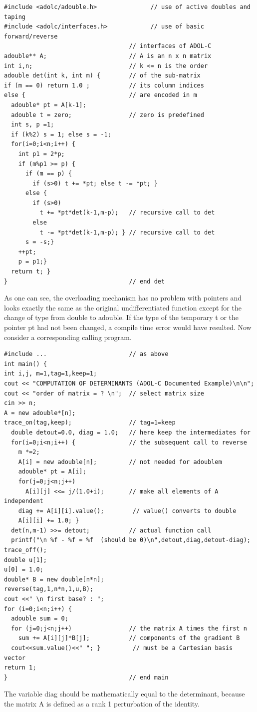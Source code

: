 \documentclass[11pt,twoside]{article}
\begin{document}
\begin{verbatim}
#include <adolc/adouble.h>               // use of active doubles and taping
#include <adolc/interfaces.h>            // use of basic forward/reverse
                                   // interfaces of ADOL-C
adouble** A;                       // A is an n x n matrix
int i,n;                           // k <= n is the order
adouble det(int k, int m) {        // of the sub-matrix
if (m == 0) return 1.0 ;           // its column indices
else {                             // are encoded in m
  adouble* pt = A[k-1];
  adouble t = zero;                // zero is predefined
  int s, p =1;
  if (k%2) s = 1; else s = -1;
  for(i=0;i<n;i++) {
    int p1 = 2*p;
    if (m%p1 >= p) {
      if (m == p) {
        if (s>0) t += *pt; else t -= *pt; }
      else {
        if (s>0)
          t += *pt*det(k-1,m-p);   // recursive call to det
        else
          t -= *pt*det(k-1,m-p); } // recursive call to det
      s = -s;}
    ++pt;
    p = p1;}
  return t; }
}                                  // end det
\end{verbatim}
As one can see, the overloading mechanism has no problem with pointers
and looks exactly the same as the original undifferentiated function
except for the change of type from {\sf double} to {\sf adouble}.
If the type of the temporary {\sf t} or the pointer {\sf pt} had not been changed,
a compile time error would have resulted. Now consider a corresponding
calling program.

\begin{verbatim}
#include ...                       // as above
int main() {
int i,j, m=1,tag=1,keep=1;
cout << "COMPUTATION OF DETERMINANTS (ADOL-C Documented Example)\n\n";
cout << "order of matrix = ? \n";  // select matrix size
cin >> n;
A = new adouble*[n];              
trace_on(tag,keep);                // tag=1=keep
  double detout=0.0, diag = 1.0;   // here keep the intermediates for
  for(i=0;i<n;i++) {               // the subsequent call to reverse
    m *=2;
    A[i] = new adouble[n];         // not needed for adoublem
    adouble* pt = A[i];
    for(j=0;j<n;j++)
      A[i][j] <<= j/(1.0+i);       // make all elements of A independent
    diag += A[i][i].value();        // value() converts to double
    A[i][i] += 1.0; }
  det(n,m-1) >>= detout;           // actual function call 
  printf("\n %f - %f = %f  (should be 0)\n",detout,diag,detout-diag);
trace_off();
double u[1];
u[0] = 1.0;
double* B = new double[n*n];
reverse(tag,1,n*n,1,u,B);
cout <<" \n first base? : ";
for (i=0;i<n;i++) {
  adouble sum = 0;
  for (j=0;j<n;j++)                // the matrix A times the first n
    sum += A[i][j]*B[j];           // components of the gradient B
  cout<<sum.value()<<" "; }         // must be a Cartesian basis vector
return 1;
}                                  // end main
\end{verbatim}
The variable {\sf diag} should be mathematically 
equal to the determinant, because the
matrix {\sf A} is defined as a rank 1 perturbation of the identity.
%
\end{document}
